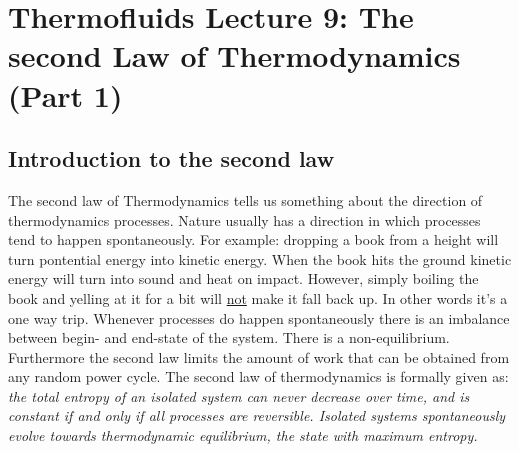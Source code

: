 \documentclass[11pt, a4paper]{article}
\begin{document}
\setcounter{section}{8}
\setcounter{equation}{0}
\section{Thermofluids Lecture 9: The second Law of Thermodynamics (Part 1)}


\subsection{Introduction to the second law}
The second law of Thermodynamics tells us something about the direction of thermodynamics processes. Nature usually has a direction in which processes tend to happen spontaneously. For example: dropping a book from a height will turn pontential energy into kinetic energy. When the book hits the ground kinetic energy will turn into sound and heat on impact. However, simply boiling the book and yelling at it for a bit will \underline{not} make it fall back up. In other words it's a one way trip. Whenever processes do happen spontaneously there is an imbalance between begin- and end-state of the system. There is a non-equilibrium. Furthermore the second law limits the amount of work that can be obtained from any random power cycle. The second law of thermodynamics is formally given as: \newline
\textit{the total entropy of an isolated system can never decrease over time, and is constant if and only if all processes are reversible. Isolated systems spontaneously evolve towards thermodynamic equilibrium, the state with maximum entropy.}
\end{document}
